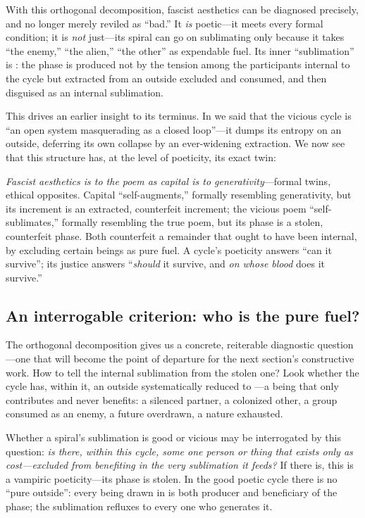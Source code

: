 With this orthogonal decomposition, fascist aesthetics can be diagnosed precisely, and no longer merely reviled as ``bad.'' It \emph{is} poetic---it meets every formal condition; it is \emph{not} just---its spiral can go on sublimating only because it takes ``the enemy,'' ``the alien,'' ``the other'' as expendable fuel. Its inner ``sublimation'' is : the phase is produced not by the tension among the participants internal to the cycle but extracted from an outside excluded and consumed, and then disguised as an internal sublimation.

This drives an earlier insight to its terminus. In  we said that the vicious cycle is ``an open system masquerading as a closed loop''---it dumps its entropy on an outside, deferring its own collapse by an ever-widening extraction. We now see that this structure has, at the level of poeticity, its exact twin:

\begin{claim}
\emph{Fascist aesthetics is to the poem as capital is to generativity}---formal twins, ethical opposites. Capital ``self-augments,'' formally resembling generativity, but its increment is an extracted, counterfeit increment; the vicious poem ``self-sublimates,'' formally resembling the true poem, but its phase is a stolen, counterfeit phase. Both counterfeit a remainder that ought to have been internal, by excluding certain beings as pure fuel. A cycle's poeticity answers ``can it survive''; its justice answers ``\emph{should} it survive, and \emph{on whose blood} does it survive.''
\end{claim}

\subsection{An interrogable criterion: who is the pure fuel?}
\label{p09:sec:fuel}

The orthogonal decomposition gives us a concrete, reiterable diagnostic question---one that will become the point of departure for the next section's constructive work. How to tell the internal sublimation from the stolen one? Look whether the cycle has, within it, an outside systematically reduced to ---a being that only contributes and never benefits: a silenced partner, a colonized other, a group consumed as an enemy, a future overdrawn, a nature exhausted.

\begin{claim}
Whether a spiral's sublimation is good or vicious may be interrogated by this question: \emph{is there, within this cycle, some one person or thing that exists only as cost---excluded from benefiting in the very sublimation it feeds?} If there is, this is a vampiric poeticity---its phase is stolen. In the good poetic cycle there is no ``pure outside'': every being drawn in is both producer and beneficiary of the phase; the sublimation refluxes to every one who generates it.
\end{claim}

